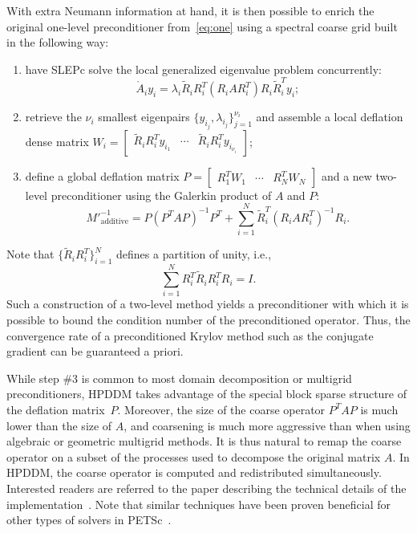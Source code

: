 \documentclass[3p,11pt]{elsarticle}
\begin{document}
With extra Neumann information at hand, it is then possible to enrich the original one-level preconditioner
from~\cref{eq:one} using a spectral coarse grid built in the following way:
\begin{enumerate}
    \item have SLEPc solve the local generalized eigenvalue problem concurrently:
        \begin{equation}\label{eq:gevp}
            \mathring{A}_i y_i = \lambda_i \tilde{R}_i R_i^T (R_i A R_i^T) R_i \tilde{R}_i^T y_i ;
        \end{equation}
    \item retrieve the $\nu_i$ smallest eigenpairs $\{y_{i_j}, \lambda_{i_j}\}_{j=1}^{\nu_i}$ and assemble a local deflation dense matrix $W_i = \begin{bmatrix} \tilde{R}_i R_i^T y_{i_1} & \cdots & \tilde{R}_i R_i^T y_{i_{\nu_i}} \end{bmatrix}$;
    \item define a global deflation matrix $P = \begin{bmatrix} R_1^T W_1 & \cdots & R_N^T W_N\end{bmatrix}$ and a new two-level preconditioner using the Galerkin product of $A$ and $P$:
        \begin{equation}\label{eq:two}
            M'^{-1}_{\text{additive}} = P \left(P^T A P\right)^{-1} P^T + \sum_{i = 1}^N \tilde{R}_i^T (R_i A R_i^T)^{-1} R_i.
        \end{equation}
\end{enumerate}
Note that $\{\tilde{R}_i R_i^T\}_{i=1}^N$ defines a partition of unity, i.e.,
\begin{equation*}
    \sum_{i = 1}^N R_i^T \tilde{R}_i R_i^T R_i = I.
\end{equation*}
Such a construction of a two-level method yields a preconditioner with which it
is possible to bound the condition number of the preconditioned operator. Thus,
the convergence rate of a preconditioned Krylov method such as the conjugate
gradient can be guaranteed a priori.

While step \#3 is common to most domain
decomposition or multigrid preconditioners, HPDDM takes advantage of the special
block sparse structure of the deflation matrix~$P$.
Moreover,
the size of the coarse operator $P^TAP$ is much lower
than the size of $A$, and coarsening is much more aggressive than
when using algebraic or geometric multigrid methods.
It is thus natural to remap the coarse operator on
a subset of the processes used to decompose the original matrix $A$. In HPDDM, the coarse operator is
computed and redistributed simultaneously.
Interested readers are referred to the paper describing the technical
details of the implementation~\cite{jolivet2013scalable}.
Note that similar techniques have been proven beneficial for other types
of solvers in PETSc~\cite{may2016extreme}.
\end{document}
